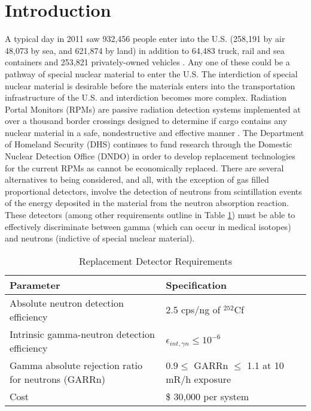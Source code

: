 \section{Introduction}

A typical day in 2011 saw 932,456 people enter into the U.S. (258,191 by air 48,073 by sea, and 621,874 by land) in addition to 64,483 truck, rail and sea containers and 253,821 privately-owned vehicles \cite{cpb_typical_2012} .
Any one of these could be a pathway of special nuclear material to enter the U.S.
The interdiction of special nuclear material is desirable before the materials enters into the transportation infrastructure of the U.S. and interdiction becomes more complex.
Radiation Portal Monitors (RPMs) are passive radiation detection systems implemented at over a thousand border crossings designed to determine if cargo contains any nuclear material in a safe, nondestructive and effective manner \cite{kouzes_neutron_2010} .
The Department of Homeland Security (DHS) continues to fund research through the Domestic Nuclear Detection Office (DNDO) in order to develop replacement technologies for the current  RPMs as  cannot be economically replaced.
There are several alternatives to  being considered, and all, with the exception of gas filled proportional detectors, involve the detection of neutrons from scintillation events of the energy deposited in the material from the neutron absorption reaction.
These detectors (among other requirements outline in Table \ref{tab:DHSCriteria}) must be able to effectively discriminate between gamma (which can occur in medical isotopes) and neutrons (indictive of special nuclear material).
\begin{table}[h]
    \caption{Replacement Detector Requirements  }
	\centering
	\begin{tabular}{p{} | p{} }
	Parameter & Specification \\
	\hline
	\hline
	Absolute neutron detection efficiency & 2.5 cps/ng of ${}^{252}$Cf \\
	Intrinsic gamma-neutron detection efficiency & $ \epsilon_{int,\gamma n}\leq 10^{-6}$ \\
	Gamma absolute rejection ratio for neutrons (GARRn) & $ 0.9 \leq \text{ GARRn }\leq$ 1.1 at 10 mR/h exposure \\
	Cost &  \$ 30,000 per system \\
	\hline
	\end{tabular}
    \label{tab:DHSCriteria}
\end{table}

